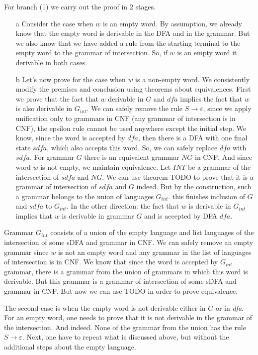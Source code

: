 For branch (1) we carry out the proof in 2 stages.
\begin{enumerate}
\item[a] Consider the case when $w$ is an empty word.
By assumption, we already know that the empty word is derivable in the DFA and in the grammar. But we also know that we have added a rule from the starting terminal to the empty word to the grammar of intersection. So, if $w$ is an empty word it derivable in both cases.
\item[b] Let's now prove for the case when $w$ is a non-empty word.
We consistently modify the premises and conclusion using theorems about equivalences. First we prove that the fact that $w$ derivable in $G$ and $dfa$ implies the fact that $w$ is also derivable in $G_{int}$. We can safely remove the rule $S \to \varepsilon$, since we apply unification only to grammars in CNF (any grammar of intersection is in CNF), the epsilon rule cannot be used anywhere except the initial step.
We know, since the word is accepted by $dfa$, then there is a DFA with one final state $sdfa$, which also accepts this word. So, we can safely replace $dfa$ with $sdfa$. 
For grammar $G$ there is an equivalent grammar $NG$ in CNF. And since word $w$ is not empty, we maintain equivalence.
Let $INT$ be a grammar of the intersection of $sdfa$ and $NG$. We can use theorem TODO to prove that it is a grammar of intersection of $sdfa$ and $G$ indeed. 
But by the construction, such a grammar belongs to the union of languages $G_{int}$. this finishes inclusion of $G$ and $sdfa$ to $G_{int}$.
In the other direction: the fact that $w$ is derivable in $G_{int}$ implies that $w$ is derivable in grammar $G$ and is accepted by DFA $dfa$. 
\end{enumerate}

Grammar $G_{int}$ consists of a union of the empty language and list languages of the intersection of some sDFA and grammar in CNF. We can safely remove an empty grammar since $w$ is not an empty word and any grammar in the list of languages of intersection is in CNF.
We know that since the word is accepted by $G_{int}$ grammar, there is a grammar from the union of grammars in which this word is derivable.
But this grammar is a grammar of intersection of some sDFA and grammar in CNF. But now we can use TODO in order to prove equivalence.

The second case is when the empty word is not derivable either in $G$ or in \textit{dfa}.
For an empty word, one needs to prove that it is not derivable in the grammar of the intersection. 
And indeed. None of the grammar from the union has the rule $S \to \varepsilon$. 
Next, one have to repeat what is discussed above, but without the additional steps about the empty language.